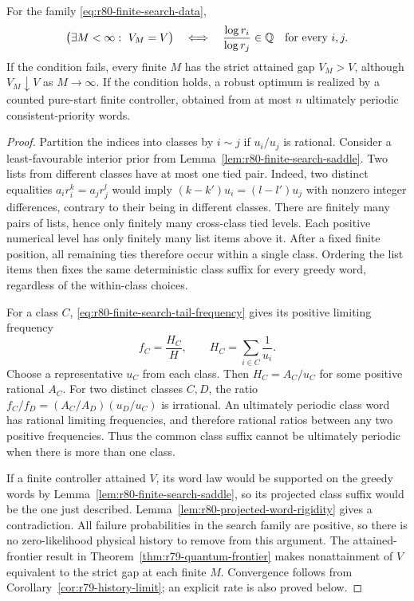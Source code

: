 \begin{theorem}
\label{thm:r80-finite-search-saturation}
For the family \eqref{eq:r80-finite-search-data},
\begin{equation}\label{eq:r80-finite-search-iff}
 \bigl(\exists M<\infty:\ V_M=V\bigr)
 \quad\Longleftrightarrow\quad
 \frac{\log r_i}{\log r_j}\in\mathbb Q
       \quad\hbox{for every }i,j.
\end{equation}
If the condition fails, every finite $M$ has the strict attained
gap $V_M>V$, although $V_M\downarrow V$ as $M\to\infty$.
If the condition holds, a robust optimum is realized by a counted
pure-start finite controller, obtained from at most $n$ ultimately
periodic consistent-priority words.
\end{theorem}
\begin{proof}
Partition the indices into classes by $i\sim j$ if $u_i/u_j$ is
rational.  Consider a least-favourable interior prior from
Lemma~\ref{lem:r80-finite-search-saddle}.  Two lists from different
classes have at most one tied pair.  Indeed, two distinct equalities
$a_ir_i^k=a_jr_j^l$ would imply
$(k-k')u_i=(l-l')u_j$ with nonzero integer differences, contrary to
their being in different classes.  There are finitely many pairs
of lists, hence only finitely many cross-class tied levels.  Each
positive numerical level has only finitely many list items above
it.  After a fixed finite position, all remaining ties therefore
occur within a single class.  Ordering the list items then fixes the
same deterministic class suffix for every greedy word, regardless
of the within-class choices.

For a class $C$, \eqref{eq:r80-finite-search-tail-frequency} gives
its positive limiting frequency
\begin{equation}\label{eq:r80-finite-search-class-frequency}
 f_C=\frac{H_C}{H},\qquad H_C=\sum_{i\in C}\frac1{u_i}.
\end{equation}
Choose a representative $u_C$ from each class.  Then
$H_C=A_C/u_C$ for some positive rational $A_C$.
For two distinct classes $C,D$, the ratio
$f_C/f_D=(A_C/A_D)(u_D/u_C)$ is irrational.  An ultimately periodic
class word has rational limiting frequencies, and therefore rational
ratios between any two positive frequencies.  Thus the common class
suffix cannot be ultimately periodic when there is more than one
class.

If a finite controller attained $V$, its word law would be supported
on the greedy words by Lemma~\ref{lem:r80-finite-search-saddle},
so its projected class suffix would be the one just described.
Lemma~\ref{lem:r80-projected-word-rigidity} gives a contradiction.
All failure probabilities in the search family are positive, so
there is no zero-likelihood physical history to remove from this
argument.  The attained-frontier result in
Theorem~\ref{thm:r79-quantum-frontier} makes nonattainment of $V$
equivalent to the strict gap at each finite $M$.  Convergence follows
from Corollary~\ref{cor:r79-history-limit}; an explicit rate is also
proved below.


\end{proof}
